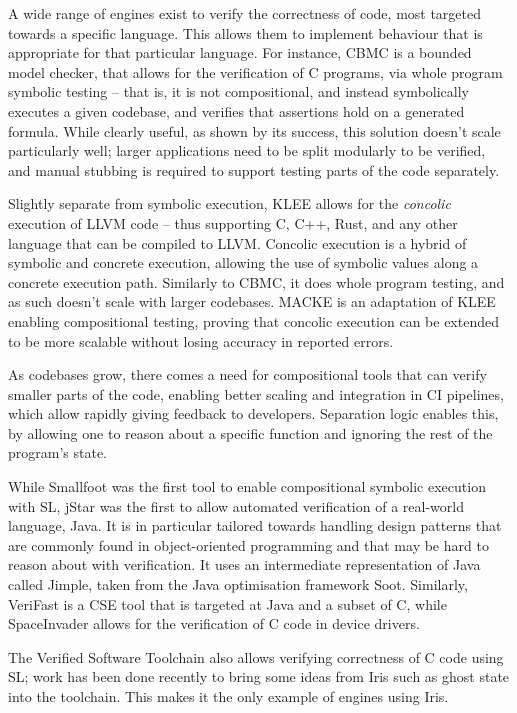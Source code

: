 A wide range of engines exist to verify the correctness of code, most targeted towards a specific language. This allows them to implement behaviour that is appropriate for that particular language.
For instance, CBMC \cite{cbmc} is a bounded model checker, that allows for the verification of C programs, via whole program symbolic testing -- that is, it is not compositional, and instead symbolically executes a given codebase, and verifies that assertions hold on a generated formula. While clearly useful, as shown by its success, this solution doesn't scale particularly well; larger applications need to be split modularly to be verified, and manual stubbing is required to support testing parts of the code separately.

Slightly separate from symbolic execution, KLEE \cite{klee} allows for the \emph{concolic} execution of LLVM code -- thus supporting C, C++, Rust, and any other language that can be compiled to LLVM. Concolic execution is a hybrid of symbolic and concrete execution, allowing the use of symbolic values along a concrete execution path. Similarly to CBMC, it does whole program testing, and as such doesn't scale with larger codebases. MACKE \cite{macke} is an adaptation of KLEE enabling compositional testing, proving that concolic execution can be extended to be more scalable without losing accuracy in reported errors.

As codebases grow, there comes a need for compositional tools that can verify smaller parts of the code, enabling better scaling and integration in CI pipelines, which allow rapidly giving feedback to developers. Separation logic enables this, by allowing one to reason about a specific function and ignoring the rest of the program's state.

While Smallfoot \cite{smallfoot} was the first tool to enable compositional symbolic execution with SL, jStar \cite{jstar} was the first to allow automated verification of a real-world language, Java. It is in particular tailored towards handling design patterns that are commonly found in object-oriented programming and that may be hard to reason about with verification. It uses an intermediate representation of Java called Jimple, taken from the Java optimisation framework Soot. Similarly, VeriFast \cite{verifast} is a CSE tool that is targeted at Java and a subset of C, while SpaceInvader \cite{spaceinvader} allows for the verification of C code in device drivers.

The Verified Software Toolchain \cite{vstiris} also allows verifying correctness of C code using SL; work has been done recently to bring some ideas from Iris such as ghost state into the toolchain. This makes it the only example of engines using Iris.

